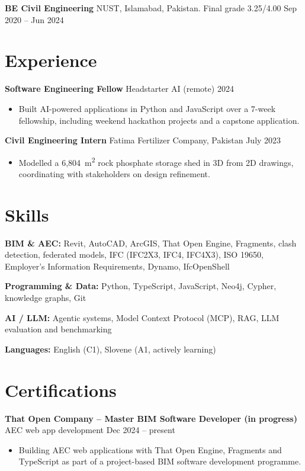 \documentclass[a4paper,10.5pt]{article}
\newcommand{\datefill}{\dotfill}
\newcommand{\entry}[3]{\vspace{2.5pt}\noindent\textbf{#1} \textbar{} #2 \datefill{} #3\par\vspace{0.5pt}}
\newcommand{\skillrow}[2]{\noindent\textbf{#1:} #2\par\vspace{1pt}}
\begin{document}
\entry{BE Civil Engineering}{NUST, Islamabad, Pakistan. Final grade 3.25/4.00}{Sep 2020 -- Jun 2024}

\section{Experience}
\entry{Software Engineering Fellow}{Headstarter AI (remote)}{2024}
\begin{itemize}
  \item Built AI-powered applications in Python and JavaScript over a 7-week fellowship,
        including weekend hackathon projects and a capstone application.
\end{itemize}

\entry{Civil Engineering Intern}{Fatima Fertilizer Company, Pakistan}{July 2023}
\begin{itemize}
  \item Modelled a 6,804~m\textsuperscript{2} rock phosphate storage shed in 3D from
        2D drawings, coordinating with stakeholders on design refinement.
\end{itemize}


\section{Skills}

\skillrow{BIM \& AEC}{Revit, AutoCAD, ArcGIS, That Open Engine, Fragments, clash detection, federated models, IFC (IFC2X3, IFC4, IFC4X3), ISO 19650, Employer's Information Requirements, Dynamo, IfcOpenShell}
\skillrow{Programming \& Data}{Python, TypeScript, JavaScript, Neo4j, Cypher, knowledge graphs, Git}
\skillrow{AI / LLM}{Agentic systems, Model Context Protocol (MCP), RAG, LLM evaluation and benchmarking}

\skillrow{Languages}{English (C1), Slovene (A1, actively learning)}

\section{Certifications}
\entry{That Open Company -- Master BIM Software Developer (in progress)}{AEC web app development}{Dec 2024 -- present}
\begin{itemize}
  \item Building AEC web applications with That Open Engine, Fragments and TypeScript
        as part of a project-based BIM software development programme.
\end{itemize}
\end{document}
